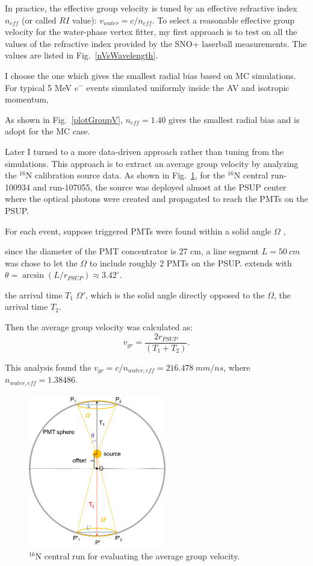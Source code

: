 In practice, the effective group velocity is tuned by an effective refractive index $n_{eff}$ (or called $RI$ value): $v_{water}=c/n_{eff}$. To select a reasonable effective group velocity for the water-phase vertex fitter, my first approach is to test on all the values of the refractive index provided by the SNO+ laserball measurements. The values are listed in Fig.~\ref{nVsWavelength}. 

I choose the one which gives the smallest radial bias based on MC simulations. 
For typical 5 MeV $e^-$ events simulated uniformly inside the AV and isotropic momentum,  

As shown in Fig.~\ref{plotGroupV}, $n_{eff}=1.40$ gives the smallest radial bias and is adopt for the MC case.


Later I turned to a more data-driven approach rather than tuning from the simulations. This approach is to extract an average group velocity by analyzing the $^{16}$N calibration source data. As shown in Fig.~\ref{n16_groupVeloctiy}, for the $^{16}$N central run-100934 and run-107055, the source was deployed almost at the PSUP center where the optical photons were created and propagated to reach the PMTs on the PSUP. 

For each event, suppose triggered PMTs were found within a solid angle $\Omega$ , 

since the diameter of the PMT concentrator is 27 cm, a line segment $L = 50~cm$ was chose to let the $\Omega$ to include roughly 2 PMTs on the PSUP.
extends with $\theta=\arcsin(L/r_{PSUP})\approx 3.42^\circ$.

the arrival time $T_1$
$\Omega'$, which is the solid angle directly opposed to the $\Omega$, the arrival time $T_2$.

Then the average group velocity was calculated as:
\begin{equation}
v_{gr}=\frac{2 r_{PSUP}}{(T_1+T_2)}.
\end{equation}

This analysis found the $v_{gr}=c/n_{water,eff}=216.478~mm/ns$, where $n_{water,eff}=1.38486$.

\begin{figure}[!htb]
	\centering
	\includegraphics[width=6cm]{n16_groupVelocity.png}
	\caption{$^{16}$N central run for evaluating the average group velocity.}
	\label{n16_groupVeloctiy}
\end{figure}

